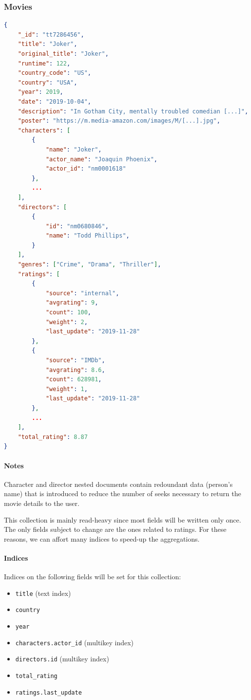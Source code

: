 \documentclass[11pt]{article}
\begin{document}
\subsubsection{Movies}
\label{sec:movies}

\begin{lstlisting}[language=json]	
{
	"_id": "tt7286456",
	"title": "Joker",
	"original_title": "Joker",
	"runtime": 122,
	"country_code": "US",
	"country": "USA",
	"year": 2019,
	"date": "2019-10-04",
	"description": "In Gotham City, mentally troubled comedian [...]",
	"poster": "https://m.media-amazon.com/images/M/[...].jpg",
	"characters": [
		{
			"name": "Joker",
			"actor_name": "Joaquin Phoenix",
			"actor_id": "nm0001618"
		},
		...
	],
	"directors": [
		{
			"id": "nm0680846",
			"name": "Todd Phillips",
		}
	],
	"genres": ["Crime", "Drama", "Thriller"],
	"ratings": [
		{
			"source": "internal",
			"avgrating": 9,
			"count": 100,
			"weight": 2,
			"last_update": "2019-11-28"
		},
		{
			"source": "IMDb",
			"avgrating": 8.6,
			"count": 628981,
			"weight": 1,
			"last_update": "2019-11-28"
		},
		...
	],
	"total_rating": 8.87
}
\end{lstlisting}

\paragraph{Notes}
Character and director nested documents contain redoundant data (person's name) that is introduced to reduce the number of seeks necessary to return the movie details
to the user.

This collection is mainly read-heavy since most fields will be written only once.
The only fields subject to change are the ones related to ratings. For these reasons,
we can affort many indices to speed-up the aggregations.

\paragraph{Indices} 
Indices on the following fields will be set for this collection:
\begin{itemize}
	\item \texttt{title} (text index)
	\item \texttt{country}
	\item \texttt{year}
	\item \texttt{characters.actor\_id} (multikey index)
	\item \texttt{directors.id} (multikey index)
	\item \texttt{total\_rating}
	\item \texttt{ratings.last\_update}
\end{itemize}
\end{document}
